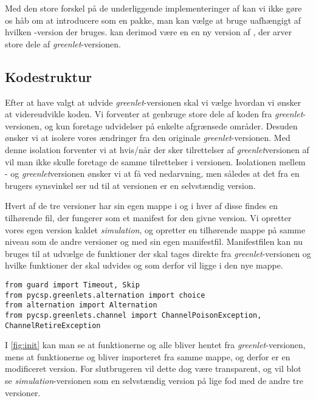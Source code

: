 Med den store forskel på de underliggende implementeringer af \csp kan vi ikke gøre os håb om at introducere \des som en pakke, man kan vælge at bruge uafhængigt af hvilken \pycsp-version  der bruges. \Des kan derimod være en en ny version af \pycsp, der arver store dele af \emph{greenlet}-versionen. 

\subsection{Kodestruktur}  
Efter at have valgt at udvide \emph{greenlet}-versionen skal vi vælge hvordan vi ønsker at videreudvikle koden. Vi forventer at genbruge store dele af koden fra \emph{greenlet}-versionen, og kun foretage udvidelser på enkelte afgrænsede områder. Desuden ønsker vi at isolere vores ændringer fra den originale \emph{greenlet}-versionen. Med denne isolation forventer vi at hvis/når der sker tilrettelser af \emph{greenlet}versionen af \pycsp vil man ikke skulle foretage de samme tilrettelser i \des versionen. 
Isolationen mellem \des- og \emph{greenlet}versionen ønsker vi at få ved nedarvning, men således at det fra en brugers synsvinkel ser ud til at \des versionen er en selvstændig version.

Hvert af de tre versioner har sin egen mappe i \pycsp og i hver af disse findes en tilhørende  fil, der fungerer som et manifest for den givne version. Vi opretter vores egen version kaldet \emph{simulation}, og opretter en tilhørende mappe på samme niveau som de andre versioner og med sin egen manifestfil. Manifestfilen kan nu bruges til at udvælge de funktioner der skal tages direkte fra \emph{greenlet}-versionen og hvilke funktioner der skal udvides og som derfor vil ligge i den nye mappe.
\begin{lstlisting}[float=hbtp,label=fig:init,caption=Uddrag af \code{\_\_init\_\_.py} for simulationsversionen.]
from guard import Timeout, Skip
from pycsp.greenlets.alternation import choice
from alternation import Alternation
from pycsp.greenlets.channel import ChannelPoisonException, ChannelRetireException
\end{lstlisting}

I \cref{fig:init} kan man se at funktionerne  og  alle bliver hentet fra \emph{greenlet}-versionen, mens at funktionerne  og  bliver importeret fra samme mappe, og derfor er en modificeret version. For slutbrugeren  vil dette dog være transparent, og vil blot se \emph{simulation}-versionen som en selvstændig version på lige fod med de andre tre versioner.

